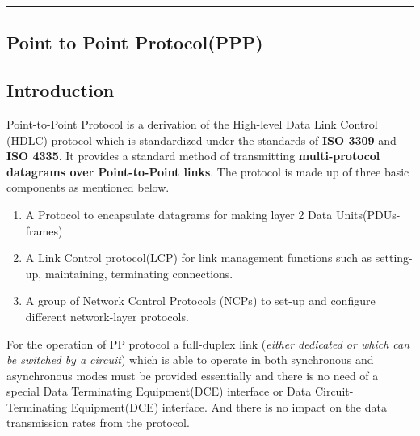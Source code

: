 \documentclass[a4paper,11pt]{article}%
\begin{document}







\hrule
\begin{center}
	\section{Point to Point Protocol(PPP)}
\end{center}


\subsection{Introduction}


Point-to-Point Protocol is a derivation of the  High-level Data Link Control (HDLC) protocol which is standardized under the standards of  \textbf{ISO 3309} and \textbf{ISO 4335}. It provides a standard method of transmitting \textbf{multi-protocol datagrams over Point-to-Point links}. The protocol is made up of three basic components as mentioned below\cite{ppp}.
\begin{enumerate}[\hspace{1cm}I.]
	\item A Protocol to encapsulate datagrams for making layer 2 Data Units(PDUs-frames)
	\item A Link Control protocol(LCP) for link management functions such as setting-up,  maintaining, terminating connections.
	\item A group of Network Control Protocols (NCPs) to set-up
	and configure different network-layer protocols.
\end{enumerate}

For the operation of PP protocol a full-duplex link (\textit{either dedicated or which can be switched by a circuit})  which is able to operate in both synchronous and asynchronous modes must be provided essentially and there is no need of a special Data Terminating Equipment(DCE) interface or Data Circuit-Terminating Equipment(DCE) interface. And there is no impact on the data transmission rates from the protocol.
\end{document}
